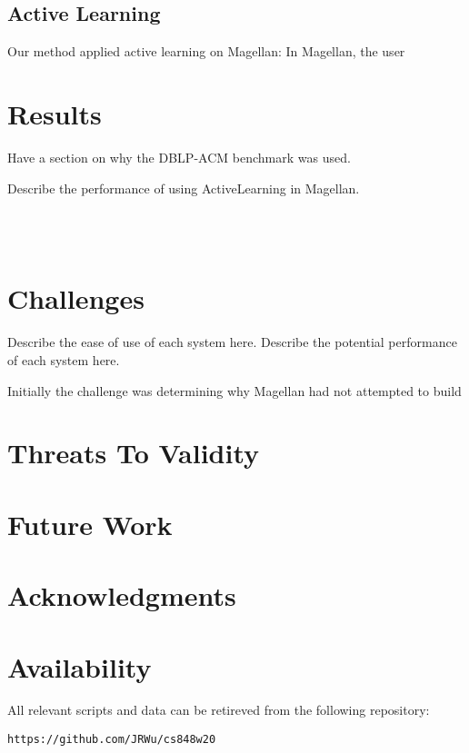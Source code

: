 \documentclass[letterpaper,twocolumn,10pt]{article}
\begin{document}
\subsection{Active Learning}
Our method applied active learning on Magellan: In Magellan, the user 

\section{Results}
Have a section on why the DBLP-ACM benchmark was used.

Describe the performance of using ActiveLearning in Magellan.


\noindent{}
\\\\

\section{Challenges}
Describe the ease of use of each system here.
Describe the potential performance of each system here.

Initially the challenge was determining why Magellan had not attempted to build 








\section{Threats To Validity}


\section{Future Work}


\section{Acknowledgments}


\section{Availability}\label{Availability}
All relevant scripts and data can be retireved from the following repository:
\begin{center}
{\tt https://github.com/JRWu/cs848w20}
\end{center}

{\footnotesize 

\theendnotes

\newpage
}
\end{document}
